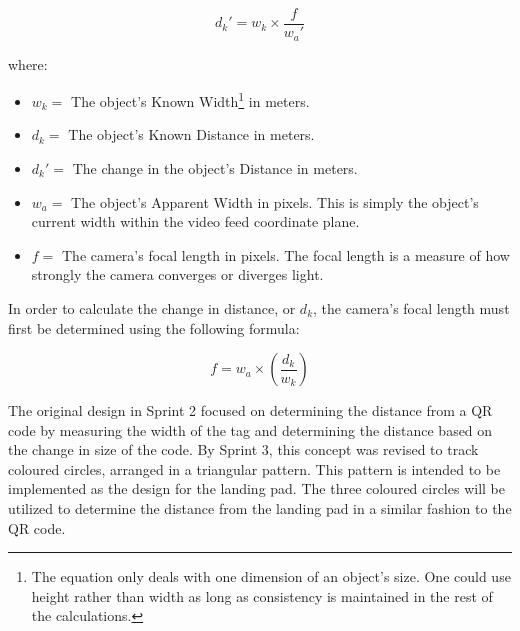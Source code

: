 \begin{equation}
	d_{k}'  = w_{k} \times \frac{f}{w_{a}'}
\end{equation}

where:
\begin{itemize}
	\item \begin{math}w_{k} =\end{math} The object's Known Width\footnote{The equation only deals with one dimension of an object's size. One could use height rather than width as long as consistency is maintained in the rest of the calculations.} in meters.
	\item \begin{math}d_{k} =\end{math} The object's Known Distance in meters.
	\item \begin{math}d_{k}' =\end{math} The change in the object's Distance in meters.
	\item \begin{math}w_{a} =\end{math} The object's Apparent Width in pixels. This is simply the object's current width within the video feed coordinate plane.
	\item \begin{math}f=\end{math} The camera's focal length in pixels. The focal length is a measure of how strongly the camera converges or diverges light.
\end{itemize}

In order to calculate the change in distance, or \begin{math}d_{k}\end{math}, the camera's focal length must first be determined using the following formula: 

\begin{equation}
	f = w_{a} \times ( \frac{d_{k}}{w_{k}} )
\end{equation}

The original design in Sprint 2 focused on determining the distance from a QR code by measuring the width of the tag and determining the distance based on the change in size of the code. By Sprint 3, this concept was revised to track coloured circles, arranged in a triangular pattern. This pattern is intended to be implemented as the design for the landing pad. The three coloured circles will be utilized to determine the distance from the landing pad in a similar fashion to the QR code. 

